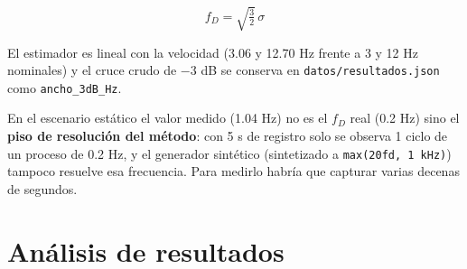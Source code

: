 \documentclass[11pt,a4paper]{article}
\begin{document}
\[
f_D = \sqrt{\tfrac{3}{2}}\,\sigma
\]

El estimador es lineal con la velocidad (3.06 y 12.70 Hz frente a 3 y 12 Hz nominales) y el cruce crudo de $-$3 dB se conserva en \texttt{datos/resultados.json} como \texttt{ancho\_3dB\_Hz}.

En el escenario estático el valor medido (1.04 Hz) no es el $f_D$ real (0.2 Hz) sino el \textbf{piso de resolución del método}: con 5 s de registro solo se observa 1 ciclo de un proceso de 0.2 Hz, y el generador sintético (sintetizado a \texttt{max(20\textperiodcentered{}fd, 1 kHz)}) tampoco resuelve esa frecuencia. Para medirlo habría que capturar varias decenas de segundos.

\section{Análisis de resultados}
\end{document}
